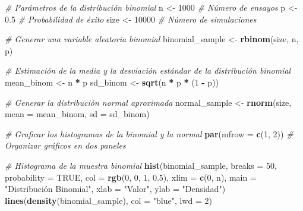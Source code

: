 \documentclass[
]{article}
\newenvironment{Shaded}{\begin{snugshade}}{\end{snugshade}}
\newcommand{\AttributeTok}[1]{\textcolor[rgb]{0.13,0.29,0.53}{#1}}
\newcommand{\CommentTok}[1]{\textcolor[rgb]{0.56,0.35,0.01}{\textit{#1}}}
\newcommand{\ConstantTok}[1]{\textcolor[rgb]{0.56,0.35,0.01}{#1}}
\newcommand{\DecValTok}[1]{\textcolor[rgb]{0.00,0.00,0.81}{#1}}
\newcommand{\FloatTok}[1]{\textcolor[rgb]{0.00,0.00,0.81}{#1}}
\newcommand{\FunctionTok}[1]{\textcolor[rgb]{0.13,0.29,0.53}{\textbf{#1}}}
\newcommand{\NormalTok}[1]{#1}
\newcommand{\OtherTok}[1]{\textcolor[rgb]{0.56,0.35,0.01}{#1}}
\newcommand{\SpecialCharTok}[1]{\textcolor[rgb]{0.81,0.36,0.00}{\textbf{#1}}}
\newcommand{\StringTok}[1]{\textcolor[rgb]{0.31,0.60,0.02}{#1}}
\begin{document}
\begin{Shaded}
\begin{Highlighting}[]
\CommentTok{\# Parámetros de la distribución binomial}
\NormalTok{n }\OtherTok{\textless{}{-}} \DecValTok{1000}  \CommentTok{\# Número de ensayos}
\NormalTok{p }\OtherTok{\textless{}{-}} \FloatTok{0.5}   \CommentTok{\# Probabilidad de éxito}
\NormalTok{size }\OtherTok{\textless{}{-}} \DecValTok{10000}  \CommentTok{\# Número de simulaciones}

\CommentTok{\# Generar una variable aleatoria binomial}
\NormalTok{binomial\_sample }\OtherTok{\textless{}{-}} \FunctionTok{rbinom}\NormalTok{(size, n, p)}

\CommentTok{\# Estimación de la media y la desviación estándar de la distribución binomial}
\NormalTok{mean\_binom }\OtherTok{\textless{}{-}}\NormalTok{ n }\SpecialCharTok{*}\NormalTok{ p}
\NormalTok{sd\_binom }\OtherTok{\textless{}{-}} \FunctionTok{sqrt}\NormalTok{(n }\SpecialCharTok{*}\NormalTok{ p }\SpecialCharTok{*}\NormalTok{ (}\DecValTok{1} \SpecialCharTok{{-}}\NormalTok{ p))}

\CommentTok{\# Generar la distribución normal aproximada}
\NormalTok{normal\_sample }\OtherTok{\textless{}{-}} \FunctionTok{rnorm}\NormalTok{(size, }\AttributeTok{mean =}\NormalTok{ mean\_binom, }\AttributeTok{sd =}\NormalTok{ sd\_binom)}

\CommentTok{\# Graficar los histogramas de la binomial y la normal}
\FunctionTok{par}\NormalTok{(}\AttributeTok{mfrow =} \FunctionTok{c}\NormalTok{(}\DecValTok{1}\NormalTok{, }\DecValTok{2}\NormalTok{))  }\CommentTok{\# Organizar gráficos en dos paneles}

\CommentTok{\# Histograma de la muestra binomial}
\FunctionTok{hist}\NormalTok{(binomial\_sample, }\AttributeTok{breaks =} \DecValTok{50}\NormalTok{, }\AttributeTok{probability =} \ConstantTok{TRUE}\NormalTok{, }
     \AttributeTok{col =} \FunctionTok{rgb}\NormalTok{(}\DecValTok{0}\NormalTok{, }\DecValTok{0}\NormalTok{, }\DecValTok{1}\NormalTok{, }\FloatTok{0.5}\NormalTok{), }\AttributeTok{xlim =} \FunctionTok{c}\NormalTok{(}\DecValTok{0}\NormalTok{, n), }
     \AttributeTok{main =} \StringTok{"Distribución Binomial"}\NormalTok{, }\AttributeTok{xlab =} \StringTok{"Valor"}\NormalTok{, }
     \AttributeTok{ylab =} \StringTok{"Densidad"}\NormalTok{)}
\FunctionTok{lines}\NormalTok{(}\FunctionTok{density}\NormalTok{(binomial\_sample), }\AttributeTok{col =} \StringTok{"blue"}\NormalTok{, }\AttributeTok{lwd =} \DecValTok{2}\NormalTok{)}


\end{Highlighting}
\end{Shaded}
\end{document}
